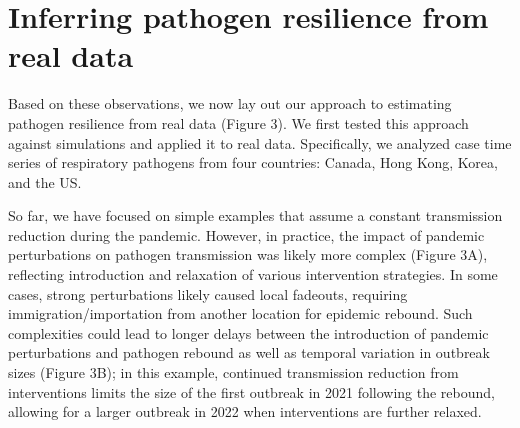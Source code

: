 \documentclass[12pt]{article}
\begin{document}
\section*{Inferring pathogen resilience from real data}

Based on these observations, we now lay out our approach to estimating pathogen resilience from real data (Figure 3).
We first tested this approach against simulations and applied it to real data.
Specifically, we analyzed case time series of respiratory pathogens from four countries: Canada, Hong Kong, Korea, and the US.

So far, we have focused on simple examples that assume a constant transmission reduction during the pandemic.
However, in practice, the impact of pandemic perturbations on pathogen transmission was likely more complex (Figure 3A), reflecting introduction and relaxation of various intervention strategies.
In some cases, strong perturbations likely caused local fadeouts, requiring immigration/importation from another location for epidemic rebound.
Such complexities could lead to longer delays between the introduction of pandemic perturbations and pathogen rebound as well as temporal variation in outbreak sizes (Figure 3B);
in this example, continued transmission reduction from interventions limits the size of the first outbreak in 2021 following the rebound, allowing for a larger outbreak in 2022 when interventions are further relaxed.
\end{document}
